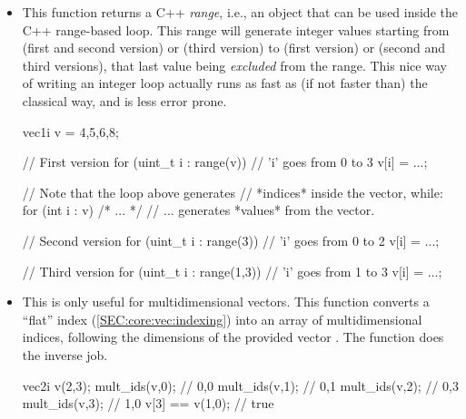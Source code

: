 \documentclass[12pt]{report}
\newenvironment{example}
{
    \begin{mdframed}[style=example,frametitle={Example}]
}
{
    \end{mdframed}
}
\begin{document}
\begin{itemize}

\item {} 



This function returns a C++ \emph{range}, i.e., an object that can be used inside the C++ range-based  loop. This range will generate integer values starting from  (first and second version) or  (third version) to  (first version) or  (second and third versions), that last value being \emph{excluded} from the range. This nice way of writing an integer  loop actually runs as fast as (if not faster than) the classical way, and is less error prone.

\begin{example}
\begin{cppcode}
vec1i v = {4,5,6,8};

// First version
for (uint_t i : range(v)) {
    // 'i' goes from 0 to 3
    v[i] = ...;
}

// Note that the loop above generates
// *indices* inside the vector, while:
for (int i : v) { /* ... */ }
// ... generates *values* from the vector.

// Second version
for (uint_t i : range(3)) {
    // 'i' goes from 0 to 2
    v[i] = ...;
}

// Third version
for (uint_t i : range(1,3)) {
    // 'i' goes from 1 to 3
    v[i] = ...;
}
\end{cppcode}
\end{example}

\item {} 

This is only useful for multidimensional vectors. This function converts a ``flat'' index  (\ref{SEC:core:vec:indexing}) into an array of multidimensional indices, following the dimensions of the provided vector . The  function does the inverse job.

\begin{example}
\begin{cppcode}
vec2i v(2,3);
mult_ids(v,0); // {0,0}
mult_ids(v,1); // {0,1}
mult_ids(v,2); // {0,3}
mult_ids(v,3); // {1,0}
v[3] == v(1,0); // true
\end{cppcode}
\end{example}


\end{itemize}
\end{document}

